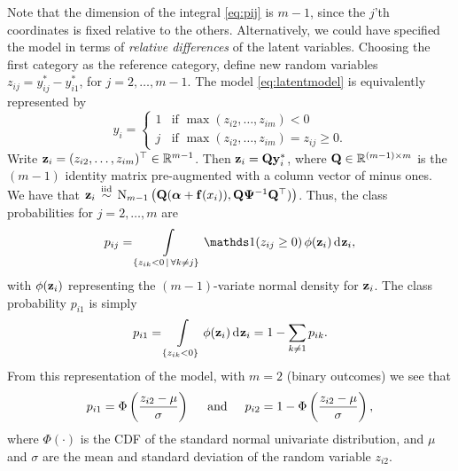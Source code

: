 Note that the dimension of the integral \eqref{eq:pij} is $m-1$, since the $j$'th coordinates is fixed relative to the others.
Alternatively, we could have specified the model in terms of \emph{relative differences} of the latent variables.
Choosing the first category as the reference category, define new random variables $z_{ij} = y_{ij}^* - y_{i1}^*$, for $j = 2,\dots,m-1$. 
The model \cref{eq:latentmodel} is equivalently represented by
\begin{equation}
  y_i = 
  \begin{cases}
    1 & \text{if } \max (z_{i2},\dots,z_{im}) < 0 \\
    j & \text{if } \max (z_{i2},\dots,z_{im}) = z_{ij} \geq 0.
  \end{cases}
\end{equation} 
Write ${\mathbf z}_i = (z_{i2},\dots,z_{im})^\top \in \mathbb{R}^{m-1}$.
Then ${\mathbf z}_i = {\mathbf Q}{\mathbf y}^*_i$, where ${\mathbf Q} \in \mathbb{R}^{(m-1)\times m}$  is the $(m-1)$ identity matrix pre-augmented with a column vector of minus ones.
We have that ${\mathbf z}_i \,\overset{\text{iid}}{\sim}\, \operatorname{N}_{m-1}\big({\mathbf Q}({\bm\alpha} + {\mathbf f}(x_i)), {\mathbf Q}{\bm\Psi}^{-1}{\mathbf Q}^\top)\big)$.
Thus, the class probabilities for $j=2,\dots,m$ are
\begin{align}
  p_{ij} = 
  \int\displaylimits_{\{z_{ik} < 0 \,|\, \forall k \neq j \}} \ind(z_{ij} \geq 0) \,\phi(\bz_i) \dint\bz_i \label{eq:pij2},
\end{align}
with $\phi({\mathbf z}_i)$ representing the $(m-1)$-variate normal density for ${\mathbf z}_i$.
The class probability $p_{i1}$ is simply
\[
  p_{i1} = \int\displaylimits_{\{ z_{ik} <0 \}}  \phi({\mathbf z}_i) \operatorname{d}\hspace{0.5pt}\!{\mathbf z}_i = 1 - \sum_{k\neq 1} p_{ik}.
\]
From this representation of the model, with $m=2$ (binary outcomes) we see that
\[
  p_{i1} = 
  \Phi \left( \frac{z_{i2} - \mu}{\sigma} \right)
  \hspace{0.5cm}\text{and}\hspace{0.5cm}
  p_{i2} = 
  1 - \Phi \left( \frac{z_{i2} - \mu}{\sigma} \right),
\]
where $\Phi(\cdot)$ is the CDF of the standard normal univariate distribution, and $\mu$ and $\sigma$ are the mean and standard deviation of the random variable $z_{i2}$.




